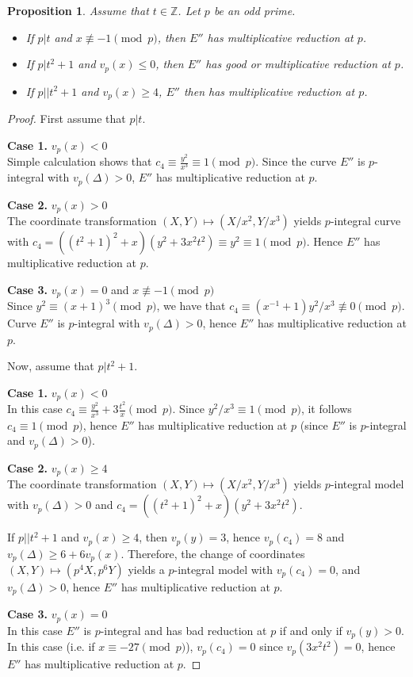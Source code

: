 \documentclass[11pt]{amsart}
\theoremstyle{plain}
\newtheorem{proposition}{Proposition}
\theoremstyle{remark}
\begin{document}
\begin{proposition}
\label{prop:cases}
Assume that $t \in \mathbb{Z}$. Let $p$ be an odd prime.
\begin{itemize}
	\item [a)] If $p|t$ and $x \not \equiv -1 \pmod{p}$, then $E''$ has multiplicative reduction at $p$.
	\item [b)] If $p|t^2+1$ and  $v_p(x) \le 0$, then $E''$ has good or multiplicative reduction at $p$.
	\item [c)] If $p||t^2+1$ and $v_p(x) \ge 4$, $E''$ then has multiplicative reduction at $p$.
\end{itemize}
\end{proposition}

\begin{proof}
First assume that $p|t$.

\noindent\textbf{Case 1.}  $v_p(x)<0$\\
Simple calculation shows that $c_4 \equiv \frac{y^2}{x^3}\equiv 1 \pmod{p}$. Since the curve $E''$ is $p$-integral with $v_p(\Delta)>0$, $E''$ has multiplicative reduction at $p$.

\noindent\textbf{Case 2.} $v_p(x)>0$\\
The coordinate transformation $(X,Y)\mapsto (X/x^2, Y/x^3)$ yields $p$-integral curve with $c_4=((t^2+1)^2+x)(y^2+3x^2t^2)\equiv y^2 \equiv 1 \pmod{p}$. Hence $E''$ has multiplicative reduction at $p$.

\noindent\textbf{Case 3.} $v_p(x)=0$ and $x \not\equiv -1 \pmod{p}$\\
Since $y^2 \equiv (x+1)^3 \pmod{p}$, we have that $c_4 \equiv (x^{-1}+1)y^2/x^3 \not \equiv 0 \pmod{p}$. Curve $E''$ is $p$-integral with $v_p(\Delta)>0$, hence $E''$ has multiplicative reduction at $p$.

Now, assume that $p|t^2+1$.

\noindent\textbf{Case 1.} $v_p(x)<0$\\
In this case $c_4\equiv \frac{y^2}{x^3}+ 3 \frac{t^2}{x} \pmod{p}$. Since
$y^2/x^3 \equiv 1 \pmod{p}$, it follows $c_4 \equiv 1 \pmod{p}$, hence $E''$ has multiplicative reduction at $p$ (since $E''$ is $p$-integral and $v_p(\Delta)>0$).

\noindent\textbf{Case 2.} $v_p(x)\ge 4$\\
The coordinate transformation $(X,Y)\mapsto (X/x^2, Y/x^3)$ yields $p$-integral model with $v_p(\Delta)>0$ and $c_4 = ((t^2+1)^2+x)(y^2+3x^2t^2)$.

If $p||t^2+1$ and $v_p(x)\ge 4$, then $v_p(y) = 3$, hence $v_p(c_4)=8$ and $v_p(\Delta)\ge 6 + 6 v_p(x)$. Therefore, the change of coordinates $(X,Y) \mapsto (p^4X, p^6Y)$ yields a $p$-integral model with $v_p(c_4)=0$, and $v_p(\Delta)>0$, hence $E''$ has multiplicative reduction at $p$.

\noindent\textbf{Case 3.} $v_p(x)=0$\\
In this case $E''$ is $p$-integral and has bad reduction at $p$ if and only if $v_p(y)>0$. In this case (i.e. if $x \equiv -27 \pmod{p}$), $v_p(c_4)=0$ since $v_p(3x^2t^2)= 0$, hence $E''$ has multiplicative reduction at $p$.
\end{proof}
\end{document}
